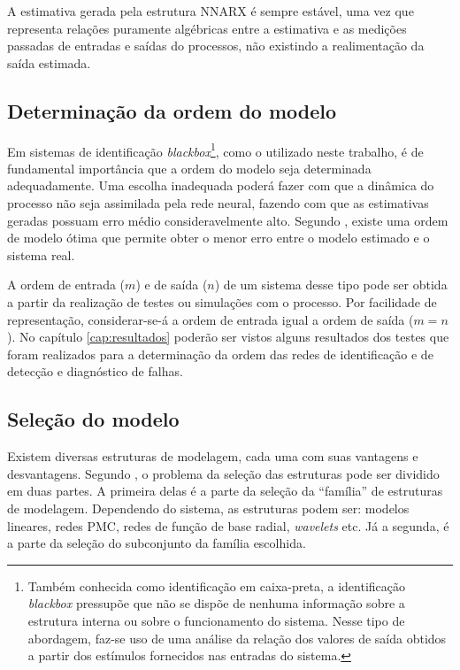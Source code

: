 A estimativa gerada pela estrutura NNARX é sempre estável, uma vez que
representa relações puramente algébricas entre a estimativa e as medições
passadas de entradas e saídas do processos, não existindo a realimentação da
saída estimada.

\subsection{Determinação da ordem do modelo}
\label{sec:det_ordem}
Em sistemas de identificação {\it blackbox}\footnote{Também conhecida como
identificação em caixa-preta, a identificação {\it blackbox} pressupõe que não
se dispõe de nenhuma informação sobre a estrutura interna ou sobre o
funcionamento do sistema. Nesse tipo de abordagem, faz-se uso de uma análise da
relação dos valores de saída obtidos a partir dos estímulos fornecidos nas
entradas do sistema.}, como o utilizado neste trabalho, é de fundamental
importância que a ordem do modelo seja determinada adequadamente.  Uma escolha
inadequada poderá fazer com que a dinâmica do processo não seja assimilada pela
rede neural, fazendo com que as estimativas geradas possuam erro médio
consideravelmente alto. Segundo , existe uma ordem de
modelo ótima que permite obter o menor erro entre o modelo estimado e o sistema
real.

A ordem de entrada ($m$) e de saída ($n$) de um sistema desse tipo pode ser
obtida a partir da realização de testes ou simulações com o processo. Por
facilidade de representação, considerar-se-á a ordem de entrada igual a ordem de
saída ($m = n$). No capítulo \ref{cap:resultados} poderão ser vistos alguns
resultados dos testes que foram realizados para a determinação da ordem das
redes de identificação e de detecção e diagnóstico de falhas.

\subsection{Seleção do modelo}
Existem diversas estruturas de modelagem, cada uma com suas vantagens e
desvantagens. Segundo , o problema da seleção das
estruturas pode ser dividido em duas partes. A primeira delas é a parte da
seleção da ``família'' de estruturas de modelagem. Dependendo do sistema, as
estruturas podem ser: modelos lineares, redes PMC, redes de função de base
radial, {\it wavelets} etc. Já a segunda, é a parte da seleção do subconjunto da
família escolhida.

